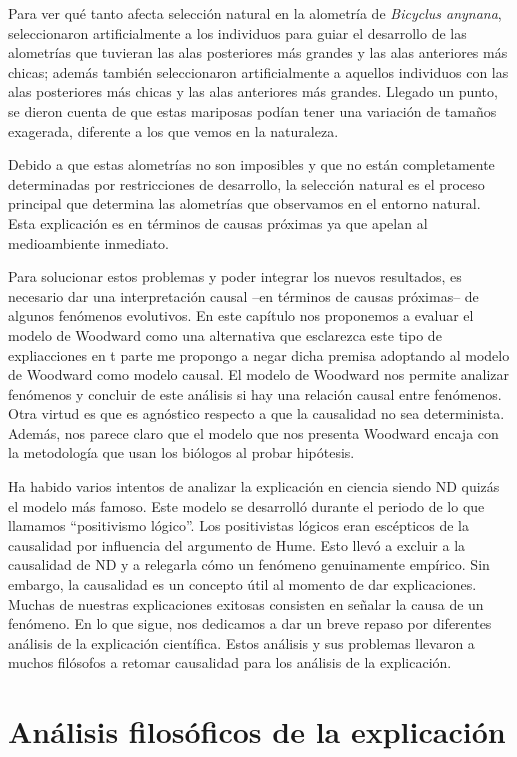 {Para ver qué tanto afecta selección natural en la alometría de \emph{Bicyclus anynana}, seleccionaron artificialmente a los individuos para guiar el desarrollo de las alometrías que tuvieran las alas posteriores más grandes y las alas anteriores más chicas; además también seleccionaron artificialmente a aquellos individuos con las alas posteriores más chicas y las alas anteriores más grandes. Llegado un punto, se dieron cuenta de que estas mariposas podían tener una variación de tamaños exagerada, diferente a los que vemos en la naturaleza.

Debido a que estas alometrías no son imposibles y que no están completamente determinadas por restricciones de desarrollo, la selección natural es el proceso principal que determina las alometrías que observamos en el entorno natural. Esta explicación es en términos de causas próximas ya que apelan al medioambiente inmediato.

Para solucionar estos problemas y poder integrar los nuevos resultados, es necesario dar una interpretación causal --en términos de causas próximas-- de algunos fenómenos evolutivos. En este capítulo nos proponemos a evaluar el modelo de Woodward como una alternativa que esclarezca este tipo de expliacciones en t parte me propongo a negar dicha premisa adoptando al modelo de Woodward como modelo causal. El modelo de Woodward nos permite analizar fenómenos y concluir de este análisis si hay una relación causal entre fenómenos. Otra virtud es que es agnóstico respecto a que la causalidad no sea determinista. Además, nos parece claro que el modelo que nos presenta Woodward encaja con la metodología que usan los biólogos al probar hipótesis.

Ha habido varios intentos de analizar la explicación en ciencia siendo ND quizás el modelo más famoso. Este modelo se desarrolló durante el periodo de lo que llamamos ``positivismo lógico''. Los positivistas lógicos eran escépticos de la causalidad por influencia del argumento de Hume. Esto llevó a excluir a la causalidad de ND y a relegarla cómo un fenómeno genuinamente empírico. Sin embargo, la causalidad es un concepto útil al momento de dar explicaciones. Muchas de nuestras explicaciones exitosas consisten en señalar la causa de un fenómeno. En lo que sigue, nos dedicamos a dar un breve repaso por diferentes análisis de la explicación científica. Estos análisis y sus problemas llevaron a muchos filósofos a retomar causalidad para los análisis de la explicación.

\section{Análisis filosóficos de la explicación}

}

